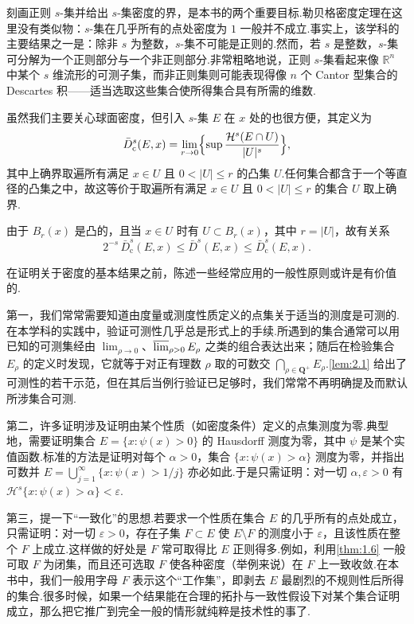 刻画正则 $s$-集并给出 $s$-集密度的界，是本书的两个重要目标.勒贝格密度定理在这里没有类似物：$s$-集在几乎所有的点处密度为 $1$ 一般并不成立.事实上，该学科的主要结果之一是：除非 $s$ 为整数，$s$-集不可能是正则的.然而，若 $s$ 是整数，$s$-集可分解为一个正则部分与一个非正则部分.非常粗略地说，正则 $s$-集看起来像 $\mathbb{R}^n$ 中某个 $s$ 维流形的可测子集，而非正则集则可能表现得像 $n$ 个 Cantor 型集合的 Descartes 积——适当选取这些集合使所得集合具有所需的维数.

虽然我们主要关心球面密度，但引入 $s$-集 $E$ 在 $x$ 处的也很方便，其定义为
\begin{equation}\label{eq:2.1}
  \bar{D}^{s}_{\mathrm{c}}(E,x)=\lim_{r\to 0}\Bigl\{\sup\frac{\mathcal{H}^{s}(E\cap U)}{|U|^{s}}\Bigr\},
\end{equation}
其中上确界取遍所有满足 $x\in U$ 且 $0<|U|\leq r$ 的凸集 $U$.任何集合都含于一个等直径的凸集之中，故这等价于取遍所有满足 $x\in U$ 且 $0<|U|\leq r$ 的集合 $U$ 取上确界.

由于 $B_r(x)$ 是凸的，且当 $x\in U$ 时有 $U\subset B_r(x)$，其中 $r=|U|$，故有关系
\begin{equation}\label{eq:2.2}
  2^{-s}\,\bar{D}^{s}_{\mathrm{c}}(E,x)\leq\bar{D}^{s}(E,x)\leq\bar{D}^{s}_{\mathrm{c}}(E,x).
\end{equation}

在证明关于密度的基本结果之前，陈述一些经常应用的一般性原则或许是有价值的.

第一，我们常常需要知道由度量或测度性质定义的点集关于适当的测度是可测的.在本学科的实践中，验证可测性几乎总是形式上的手续.所遇到的集合通常可以用已知的可测集经由 $\lim_{\rho\to 0}$、$\varlimsup_{\rho>0}E_\rho$ 之类的组合表达出来；随后在检验集合 $E_\rho$ 的定义时发现，它就等于对正有理数 $\rho$ 取的可数交 $\bigcap_{\rho\in\mathbf{Q}^+}E_\rho$.\cref{lem:2.1} 给出了可测性的若干示范，但在其后当例行验证已足够时，我们常常不再明确提及而默认所涉集合可测.

第二，许多证明涉及证明由某个性质（如密度条件）定义的点集测度为零.典型地，需要证明集合 $E=\{x:\psi(x)>0\}$ 的 Hausdorff 测度为零，其中 $\psi$ 是某个实值函数.标准的方法是证明对每个 $\alpha>0$，集合 $\{x:\psi(x)>\alpha\}$ 测度为零，并指出可数并 $E=\bigcup_{j=1}^{\infty}\{x:\psi(x)>1/j\}$ 亦必如此.于是只需证明：对一切 $\alpha,\varepsilon>0$ 有 $\mathcal{H}^s\{x:\psi(x)>\alpha\}<\varepsilon$.

第三，提一下``一致化''的思想.若要求一个性质在集合 $E$ 的几乎所有的点处成立，只需证明：对一切 $\varepsilon>0$，存在子集 $F\subset E$ 使 $E\setminus F$ 的测度小于 $\varepsilon$，且该性质在整个 $F$ 上成立.这样做的好处是 $F$ 常可取得比 $E$ 正则得多.例如，利用\cref{thm:1.6} 一般可取 $F$ 为闭集，而且还可选取 $F$ 使各种密度（举例来说）在 $F$ 上一致收敛.在本书中，我们一般用字母 $F$ 表示这个``工作集''，即剥去 $E$ 最剧烈的不规则性后所得的集合.很多时候，如果一个结果能在合理的拓扑与一致性假设下对某个集合证明成立，那么把它推广到完全一般的情形就纯粹是技术性的事了.

